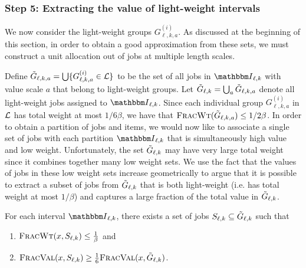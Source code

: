 \subsubsection*{Step 5: Extracting the value of light-weight intervals}

We now consider the light-weight groups $G_{\ell,k,a}^{(i)}$. As discussed at the beginning of this section, in order to obtain a good approximation from these sets, we must construct a unit allocation out of jobs at multiple length scales.

Define ${\tilde{G}}_{\ell,k,a} = \bigcup \{G_{\ell,k,a}^{(i)}\in{\mathcal{L}}\}$
to be the set of all jobs in $\Int_{\ell,k}$ with value scale $a$ that
belong to light-weight groups. Let ${\tilde{G}}_{\ell,k}=\bigcup_a {\tilde{G}}_{\ell,k,a}$
denote all light-weight jobs assigned to $\Int_{\ell,k}$.
Since each individual group
$G_{\ell,k,a}^{(i)}$ in ${\mathcal{L}}$ has total weight at most $1/6\beta$,
we have that ${\normalfont\textsc{FracWt}}({\tilde{G}}_{\ell,k,a})\le 1/2\beta$. In order to
obtain a partition of jobs and items, we would now like to associate a
single set of jobs with each partition $\Int_{\ell,k}$ that is
simultaneously high value and low weight. Unfortunately, the set
${\tilde{G}}_{\ell,k}$ may have very large total weight since
it combines together many low weight sets. We use the fact that the
values of jobs in these low weight sets increase geometrically to
argue that it is possible to extract a subset of jobs from
${\tilde{G}}_{\ell,k}$ that is both light-weight (i.e. has
total weight at most $1/\beta$) and captures a large fraction of the
total value in ${\tilde{G}}_{\ell,k}$.

\begin{lemma}
    \label{lem:a-cell-bound}
    For each interval $\Int_{\ell,k}$, there exists a set of jobs
    $S_{\ell,k} \subseteq {\tilde{G}}_{\ell,k}$ such that
    \begin{enumerate}[label=\roman*., leftmargin=2\parindent]
        \item ${\normalfont\textsc{FracWt}}(x, S_{\ell,k}) \le \frac1\beta$ and
        \item ${\normalfont\textsc{FracVal}}(x, S_{\ell,k}) \ge \frac16 {\normalfont\textsc{FracVal}}(x, {\tilde{G}}_{\ell,k})$.
    \end{enumerate}
\end{lemma}


